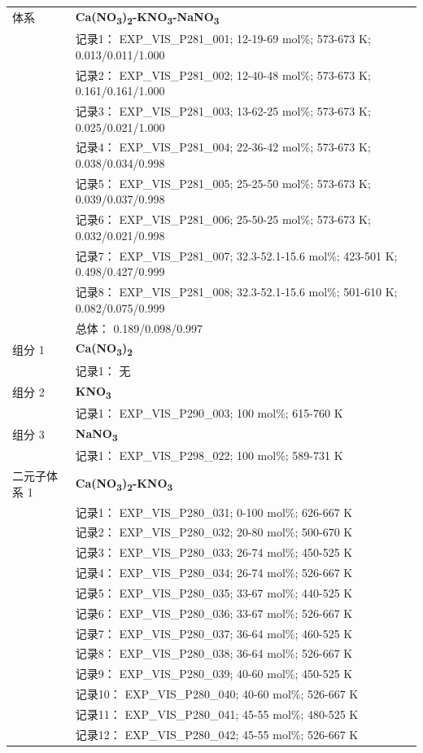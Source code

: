 \documentclass[12pt]{article}
\begin{document}
{\begin{longtable}[]{@{}
  >{\raggedright\arraybackslash}p{}
  >{\raggedright\arraybackslash}p{}@{}}
\midrule
体系 & \textbf{Ca(NO\textsubscript{3})\textsubscript{2}-KNO\textsubscript{3}-NaNO\textsubscript{3}} \\
 & 记录1： EXP\_VIS\_P281\_001; 12-19-69 mol\%; 573-673 K; 0.013/0.011/1.000 \\
 & 记录2： EXP\_VIS\_P281\_002; 12-40-48 mol\%; 573-673 K; 0.161/0.161/1.000 \\
 & 记录3： EXP\_VIS\_P281\_003; 13-62-25 mol\%; 573-673 K; 0.025/0.021/1.000 \\
 & 记录4： EXP\_VIS\_P281\_004; 22-36-42 mol\%; 573-673 K; 0.038/0.034/0.998 \\
 & 记录5： EXP\_VIS\_P281\_005; 25-25-50 mol\%; 573-673 K; 0.039/0.037/0.998 \\
 & 记录6： EXP\_VIS\_P281\_006; 25-50-25 mol\%; 573-673 K; 0.032/0.021/0.998 \\
 & 记录7： EXP\_VIS\_P281\_007; 32.3-52.1-15.6 mol\%; 423-501 K; 0.498/0.427/0.999 \\
 & 记录8： EXP\_VIS\_P281\_008; 32.3-52.1-15.6 mol\%; 501-610 K; 0.082/0.075/0.999 \\
 & 总体： 0.189/0.098/0.997  \\

组分 1 & \textbf{Ca(NO\textsubscript{3})\textsubscript{2}} \\
 & 记录1： 无 \\
组分 2  & \textbf{KNO\textsubscript{3}} \\
 & 记录1： EXP\_VIS\_P290\_003; 100 mol\%; 615-760 K  \\

组分 3  & \textbf{NaNO\textsubscript{3}} \\
 & 记录1： EXP\_VIS\_P298\_022; 100 mol\%; 589-731 K  \\

二元子体系 1  & \textbf{Ca(NO\textsubscript{3})\textsubscript{2}-KNO\textsubscript{3}} \\
 & 记录1： EXP\_VIS\_P280\_031; 0-100 mol\%; 626-667 K \\
 & 记录2： EXP\_VIS\_P280\_032; 20-80 mol\%; 500-670 K \\
 & 记录3： EXP\_VIS\_P280\_033; 26-74 mol\%; 450-525 K \\
 & 记录4： EXP\_VIS\_P280\_034; 26-74 mol\%; 526-667 K \\
 & 记录5： EXP\_VIS\_P280\_035; 33-67 mol\%; 440-525 K \\
 & 记录6： EXP\_VIS\_P280\_036; 33-67 mol\%; 526-667 K \\
 & 记录7： EXP\_VIS\_P280\_037; 36-64 mol\%; 460-525 K \\
 & 记录8： EXP\_VIS\_P280\_038; 36-64 mol\%; 526-667 K \\
 & 记录9： EXP\_VIS\_P280\_039; 40-60 mol\%; 450-525 K \\
 & 记录10： EXP\_VIS\_P280\_040; 40-60 mol\%; 526-667 K \\
 & 记录11： EXP\_VIS\_P280\_041; 45-55 mol\%; 480-525 K \\
 & 记录12： EXP\_VIS\_P280\_042; 45-55 mol\%; 526-667 K  \\


\end{longtable}}
\end{document}
